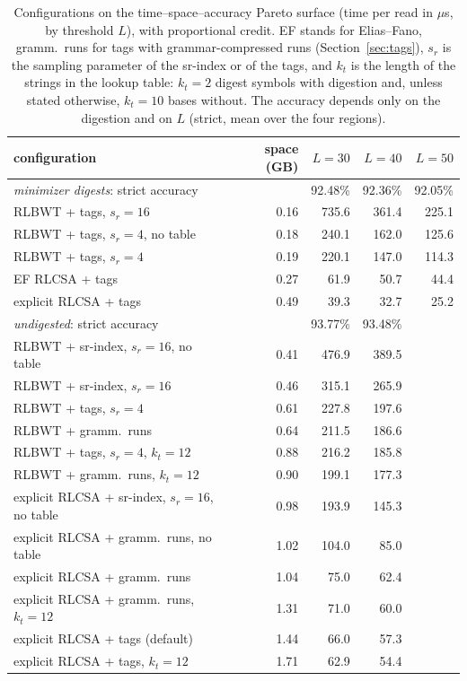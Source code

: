 \begin{table}[t]
\centering
\caption{Configurations on the time--space--accuracy Pareto surface (time per read in $\mu$s, by threshold $L$), with proportional credit.
EF stands for Elias--Fano, gramm.\ runs for tags with grammar-compressed runs (Section~\ref{sec:tags}), $s_r$ is the sampling parameter of the sr-index or of the tags, and $k_t$ is the length of the strings in the lookup table: $k_t = 2$ digest symbols with digestion and, unless stated otherwise, $k_t = 10$ bases without.
The accuracy depends only on the digestion and on $L$ (strict, mean over the four regions).}
\label{tab:pareto}
\small
\begin{tabular}{lrrrr}
\toprule
configuration & space (GB) & $L = 30$ & $L = 40$ & $L = 50$ \\
\midrule
\multicolumn{2}{l}{\emph{minimizer digests}: strict accuracy} & 92.48\% & 92.36\% & 92.05\% \\
\quad RLBWT + tags, $s_r = 16$ & 0.16 & 735.6 & 361.4 & 225.1 \\
\quad RLBWT + tags, $s_r = 4$, no table & 0.18 & 240.1 & 162.0 & 125.6 \\
\quad RLBWT + tags, $s_r = 4$ & 0.19 & 220.1 & 147.0 & 114.3 \\
\quad EF RLCSA + tags & 0.27 & 61.9 & 50.7 & 44.4 \\
\quad explicit RLCSA + tags & 0.49 & 39.3 & 32.7 & 25.2 \\
\midrule
\multicolumn{2}{l}{\emph{undigested}: strict accuracy} & 93.77\% & 93.48\% & \\
\quad RLBWT + sr-index, $s_r = 16$, no table & 0.41 & 476.9 & 389.5 & \\
\quad RLBWT + sr-index, $s_r = 16$ & 0.46 & 315.1 & 265.9 & \\
\quad RLBWT + tags, $s_r = 4$ & 0.61 & 227.8 & 197.6 & \\
\quad RLBWT + gramm.\ runs & 0.64 & 211.5 & 186.6 & \\
\quad RLBWT + tags, $s_r = 4$, $k_t = 12$ & 0.88 & 216.2 & 185.8 & \\
\quad RLBWT + gramm.\ runs, $k_t = 12$ & 0.90 & 199.1 & 177.3 & \\
\quad explicit RLCSA + sr-index, $s_r = 16$, no table & 0.98 & 193.9 & 145.3 & \\
\quad explicit RLCSA + gramm.\ runs, no table & 1.02 & 104.0 & 85.0 & \\
\quad explicit RLCSA + gramm.\ runs & 1.04 & 75.0 & 62.4 & \\
\quad explicit RLCSA + gramm.\ runs, $k_t = 12$ & 1.31 & 71.0 & 60.0 & \\
\quad explicit RLCSA + tags (default) & 1.44 & 66.0 & 57.3 & \\
\quad explicit RLCSA + tags, $k_t = 12$ & 1.71 & 62.9 & 54.4 & \\
\bottomrule
\end{tabular}
\end{table}

